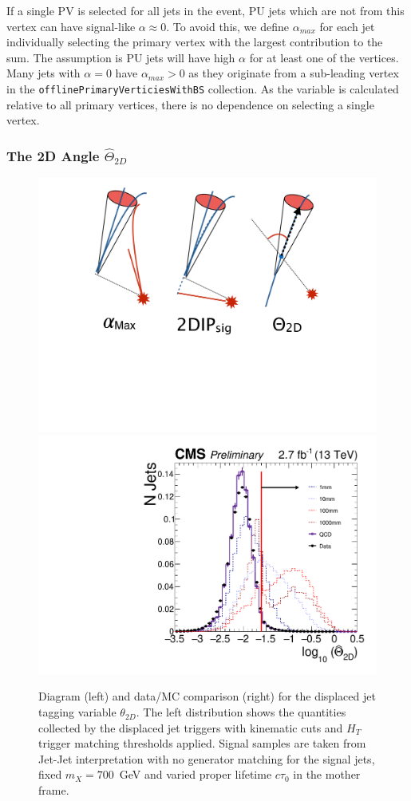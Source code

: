 If a single PV is selected for all jets in the event, PU jets which are not from this vertex can have signal-like $\alpha \approx 0$. 
To avoid this, we define $\alpha_{max}$ for each jet individually selecting the primary vertex with
the largest contribution to the sum. The assumption is PU jets will have high $\alpha$ for at least one 
of the vertices. Many jets with $\alpha = 0$ have $\alpha_{max} > 0$ as they originate
from a sub-leading vertex in the \texttt{offlinePrimaryVerticiesWithBS} collection. As the variable is calculated relative to all primary
vertices, there is no dependence on selecting a single vertex. 

\subsubsection{The 2D Angle $\hat{\Theta}_{2D}$}

\begin{figure}
\begin{center}
\includegraphics[width=.2\textwidth]{figures/pas/DIAGRAMS/theta_diag.pdf}
\includegraphics[width=.5\textwidth]{figures/pas/SELECTION/76x_pu/DJET_medianCosTheta.pdf}
\caption{Diagram (left) and data/MC comparison (right) for the displaced jet tagging variable $\theta_{2D}$. The left distribution  shows the quantities collected by the displaced jet triggers with kinematic cuts and $H_T$ trigger matching thresholds applied. Signal samples are taken from Jet-Jet interpretation with no generator matching for the signal jets, fixed $m_X=700$~GeV and varied proper lifetime $c\tau_0$ in the mother frame.
 \label{fig:theta}}
\end{center}
\end{figure}

